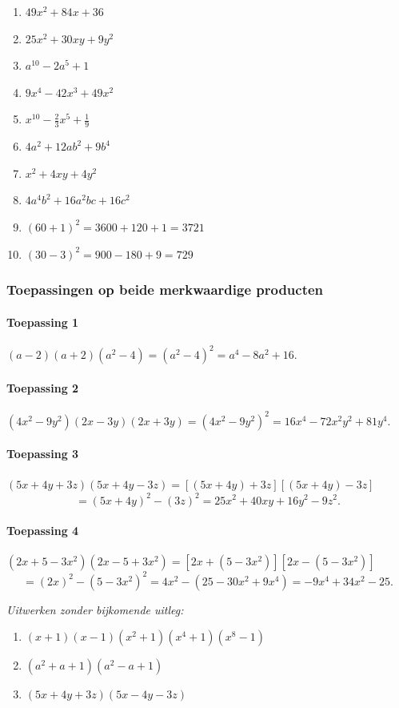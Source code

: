 \documentclass{bis}
\begin{document}
\begin{solution}
\begin{enumerate}
  \item \(49x^2+84x+36\)
  \item \(25x^2+30xy+9y^2\)
  \item \(a^{10}-2a^5+1\)
  \item \(9x^4-42x^3+49x^2\)
  \item \(x^{10}-\tfrac{2}{3}x^5+\tfrac{1}{9}\)
  \item \(4a^2+12ab^2+9b^4\)
  \item \(x^2+4xy+4y^2\)
  \item \(4a^4b^2+16a^2bc+16c^2\)
  \item \((60+1)^2=3600+120+1=3721\)
  \item \((30-3)^2=900-180+9=729\)
\end{enumerate}
\end{solution}

\subsubsection*{Toepassingen op beide merkwaardige producten}
\paragraph*{Toepassing 1}
\((a-2)(a+2)(a^2-4)=(a^2-4)^2=a^4-8a^2+16.\)

\paragraph*{Toepassing 2}
\((4x^2-9y^2)(2x-3y)(2x+3y)=(4x^2-9y^2)^2=16x^4-72x^2y^2+81y^4.\)

\paragraph*{Toepassing 3}
\((5x+4y+3z)(5x+4y-3z)=[(5x+4y)+3z][(5x+4y)-3z]\)
\[
=(5x+4y)^2-(3z)^2=25x^2+40xy+16y^2-9z^2.
\]

\paragraph*{Toepassing 4}
\((2x+5-3x^2)(2x-5+3x^2)=[2x+(5-3x^2)][2x-(5-3x^2)]\)
\[
=(2x)^2-(5-3x^2)^2=4x^2-(25-30x^2+9x^4)=-9x^4+34x^2-25.
\]

\begin{exercise}
\emph{Uitwerken zonder bijkomende uitleg:}
\begin{enumerate}
  \item \((x+1)(x-1)(x^2+1)(x^4+1)(x^8-1)\)
  \item \((a^2+a+1)(a^2-a+1)\)
  \item \((5x+4y+3z)(5x-4y-3z)\)
\end{enumerate}
\end{exercise}
\end{document}
